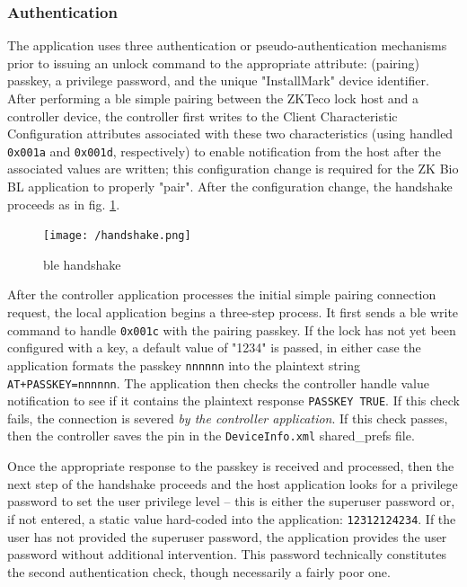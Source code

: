 \documentclass[conference]{IEEEtran}
\begin{document}
\bigskip
\subsubsection{Authentication}

The application uses three authentication or pseudo-authentication mechanisms prior to issuing an unlock command to the appropriate attribute: (pairing) passkey, a privilege password, and the unique "InstallMark" device identifier.  After performing a \gls{ble} simple pairing between the ZKTeco lock host and a controller device, the controller first writes to the Client Characteristic Configuration attributes associated with these two characteristics (using handled \verb|0x001a| and \verb|0x001d|, respectively) to enable notification from the host after the associated values are written; this configuration change is required for the ZK Bio BL application to properly "pair".   After the configuration change, the handshake proceeds as in fig. \ref{fig:handshake}.

\begin{figure}[ht]
  \texttt{[image: /handshake.png]}
  \caption{\gls{ble} handshake}
  \label{fig:handshake}
\end{figure}

\bigskip 

After the controller application processes the initial simple pairing connection request, the local application begins a three-step process.  It first sends a \gls{ble} write command to handle \verb|0x001c| with the pairing passkey.  If the lock has not yet been configured with a key, a default value of "1234" is passed, in either case the application formats the passkey \verb|nnnnnn| into the plaintext string \verb|AT+PASSKEY=nnnnnn|.  The application then checks the controller handle value notification to see if it contains the plaintext response \verb|PASSKEY TRUE|.  If this check fails, the connection is severed \textit{by the controller application}.  If this check passes, then the controller saves the pin in the \verb|DeviceInfo.xml| shared\_prefs file.

\bigskip

Once the appropriate response to the passkey is received and processed, then the next step of the handshake proceeds and the host application looks for a privilege password to set the user privilege level -- this is either the superuser password or, if not entered, a static value hard-coded into the application: \verb|12312124234|.  If the user has not provided the superuser password, the application provides the user password without additional intervention.  This password technically constitutes the second authentication check, though necessarily a fairly poor one.
\end{document}
